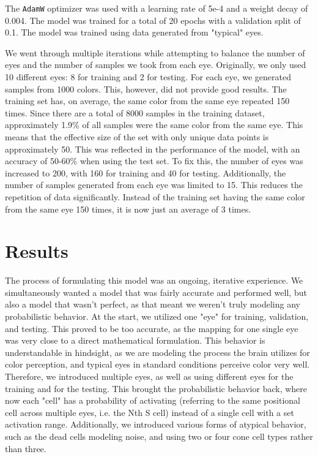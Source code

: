 \documentclass[titlepage]{article}
\begin{document}
\bigskip

The \lstinline{AdamW} optimizer was used with a learning rate of 5e-4 and a weight decay of 0.004. The model was trained for a total of 20 epochs with a validation split of 0.1. The model was trained using data generated from "typical" eyes.

\bigskip

We went through multiple iterations while attempting to balance the number of eyes and the number of samples we took from each eye. Originally, we only used 10 different eyes: 8 for training and 2 for testing. For each eye, we generated samples from 1000 colors. This, however, did not provide good results. The training set has, on average, the same color from the same eye repeated 150 times. Since there are a total of 8000 samples in the training dataset, approximately 1.9\% of all samples were the same color from the same eye. This means that the effective size of the set with only unique data points is approximately 50. This was reflected in the performance of the model, with an accuracy of 50-60\% when using the test set. To fix this, the number of eyes was increased to 200, with 160 for training and 40 for testing. Additionally, the number of samples generated from each eye was limited to 15. This reduces the repetition of data significantly. Instead of the training set having the same color from the same eye 150 times, it is now just an average of 3 times.

\section{Results}

The process of formulating this model was an ongoing, iterative experience. We simultaneously wanted a model that was fairly accurate and performed well, but also a model that wasn't perfect, as that meant we weren't truly modeling any probabilistic behavior. At the start, we utilized one "eye" for training, validation, and testing. This proved to be too accurate, as the mapping for one single eye was very close to a direct mathematical formulation. This behavior is understandable in hindsight, as we are modeling the process the brain utilizes for color perception, and typical eyes in standard conditions perceive color very well. Therefore, we introduced multiple eyes, as well as using different eyes for the training and for the testing. This brought the probabilistic behavior back, where now each "cell" has a probability of activating (referring to the same positional cell across multiple eyes, i.e. the Nth S cell) instead of a single cell with a set activation range. Additionally, we introduced various forms of atypical behavior, such as the dead cells modeling noise, and using two or four cone cell types rather than three.
\end{document}
